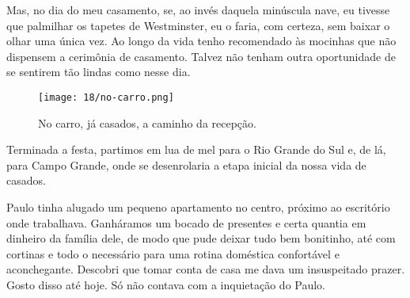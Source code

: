 Mas, no dia do meu casamento, se, ao invés daquela minúscula nave, eu tivesse que palmilhar os tapetes de Westminster, eu o faria, com certeza, sem baixar o olhar uma única vez.
Ao longo da vida tenho recomendado às mocinhas que não dispensem a cerimônia de casamento.
Talvez não tenham outra oportunidade de se sentirem tão lindas como nesse dia.

\begin{figure}[H]
\centering
\texttt{[image: 18/no-carro.png]}
\caption{No carro, já casados, a caminho da recepção.}
\end{figure}

Terminada a festa, partimos em lua de mel para o Rio Grande do Sul e, de lá, para Campo Grande, onde se desenrolaria a etapa inicial da nossa vida de casados.

Paulo tinha alugado um pequeno apartamento no centro, próximo ao escritório onde trabalhava.
Ganháramos um bocado de presentes e certa quantia em dinheiro da família dele, de modo que pude deixar tudo bem bonitinho, até com cortinas e todo o necessário para uma rotina doméstica confortável e aconchegante.
Descobri que tomar conta de casa me dava um insuspeitado prazer.
Gosto disso até hoje.
Só não contava com a inquietação do Paulo.
